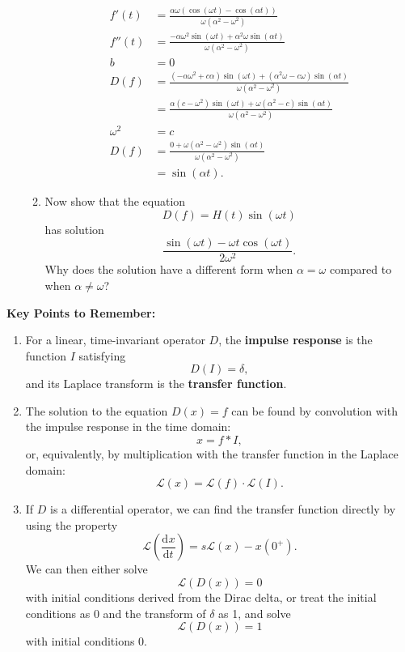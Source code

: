 \documentclass{article}
\newcommand{\deriv}[3][]{\frac{\mathrm{d}^{#1}#2}{\mathrm{d}#3^{#1}}}
\begin{document}
\begin{enumerate}
\begin{enumerate}
				\begin{align*}
					f'(t)&=\frac{\alpha\omega(\cos(\omega t) -\cos(\alpha t))}{\omega(\alpha^2-\omega^2)}\\
					f''(t)&=\frac{-\alpha\omega^2\sin(\omega t) + \alpha^2\omega\sin(\alpha t)}{\omega(\alpha^2-\omega^2)}\\
					b&=0\\
					D(f) &= \frac{(-\alpha\omega^2+c\alpha)\sin(\omega t) + (\alpha^2\omega-c\omega)\sin(\alpha t)}{\omega(\alpha^2-\omega^2)}\\
					&=\frac{\alpha(c-\omega^2)\sin(\omega t) + \omega(\alpha^2-c)\sin(\alpha t)}{\omega(\alpha^2-\omega^2)}\\
					\omega^2&=c\\
					D(f) &= \frac{0+\omega(\alpha^2-\omega^2)\sin(\alpha t)}{\omega(\alpha^2-\omega^2)}\\
					&=\sin(\alpha t).
				\end{align*}
				
				
				\fi
				
				
				
				
			\item Now show that the equation
				\[D(f)=H(t)\sin(\omega t)\]
				has solution
				\[\frac{\sin(\omega t) - \omega t\cos(\omega t)}{2\omega^2}.\]
				Why does the solution have a different form when $\alpha=\omega$ compared to when $\alpha\neq \omega$?
		\end{enumerate}
\end{enumerate}

\fi









\clearpage




{\bf Key Points to Remember:}

\vspace{5mm}

\begin{enumerate}
	\item For a linear, time-invariant operator $D$, the \textbf{impulse response} is the function $I$ satisfying 
		\[D(I)=\delta,\]
		and its Laplace transform is the \textbf{transfer function}.
	\item The solution to the equation $D(x)=f$ can be found by convolution with the impulse response in the time domain:
		\[x=f\ast I,\]
		or, equivalently, by multiplication with the transfer function in the Laplace domain:
		\[\mathcal{L}(x)=\mathcal{L}(f)\cdot\mathcal{L}(I).\]
	\item If $D$ is a differential operator, we can find the transfer function directly by using the property
		\[\mathcal{L}\left(\deriv{x}{t}\right) = s\mathcal{L}(x)-x(0^+).\]
		We can then either solve
		\[\mathcal{L}(D(x))=0\]
		with initial conditions derived from the Dirac delta, or treat the initial conditions as 0 and the transform of $\delta$ as 1, and solve
		\[\mathcal{L}(D(x))=1\]
		with initial conditions 0.
\end{enumerate}
\end{document}
